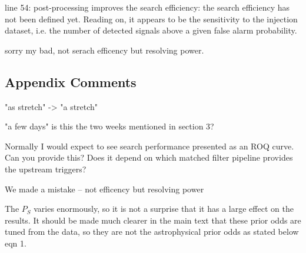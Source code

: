 \documentclass[11pt,leqno]{article}
\begin{document}
\begin{tcolorbox}[left = 1em, top = 1ex, bottom = 1ex, colupper=black, colback=black!10, adjusted title =  Comment 2]
    \setlength\parindent{2em}
	\noindent
	\ttfamily
    line 54: post-processing improves the search efficiency: the search efficiency has not been defined yet. Reading on, it appears to be the sensitivity to the injection dataset, i.e. the number of detected signals above a given false alarm probability.
\end{tcolorbox}


sorry my bad, not serach efficency but resolving power. 


\subsection*{Appendix Comments} 
\begin{tcolorbox}[left = 1em, top = 1ex, bottom = 1ex, colupper=black, colback=black!10, adjusted title =  Apdx B: Comment 1]
    \setlength\parindent{2em}
	\noindent
	\ttfamily
     "as stretch" -> "a stretch"
\end{tcolorbox}

\begin{tcolorbox}[left = 1em, top = 1ex, bottom = 1ex, colupper=black, colback=black!10, adjusted title =  Apdx B: Comment 2]
    \setlength\parindent{2em}
	\noindent
	\ttfamily
     "a few days" is this the two weeks mentioned in section 3?
\end{tcolorbox}

\begin{tcolorbox}[left = 1em, top = 1ex, bottom = 1ex, colupper=black, colback=black!10, adjusted title =  Apdx C Comment]
    \setlength\parindent{2em}
	\noindent
	\ttfamily
     Normally I would expect to see search performance presented as an ROQ curve. Can you provide this? Does it depend on which matched filter pipeline provides the upstream triggers?
\end{tcolorbox}

We made a mistake -- not efficency but resolving power

\begin{tcolorbox}[left = 1em, top = 1ex, bottom = 1ex, colupper=black, colback=black!10, adjusted title =  Apdx D Comment]
    \setlength\parindent{2em}
	\noindent
	\ttfamily
     The $P_S$ varies enormously, so it is not a surprise that it has a large effect on the results. It should be made much clearer in the main text that these prior odds are tuned from the data, so they are not the astrophysical prior odds as stated below eqn 1.
\end{tcolorbox}
\end{document}

